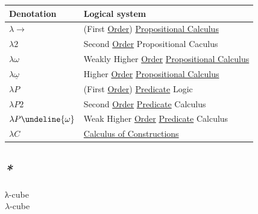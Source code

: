 \documentclass[a4paper,14pt,oneside]{book}
\begin{document}
\begin{table}[htbp]
\label{tab--lambda-calculus-names}
\centering
\begin{tabular}{ll}
Denotation & Logical system\\
\hline
\(\lambda\to\) & (First \hyperref[orgbd3dc49]{Order}) \hyperref[org263523b]{Propositional Calculus}\\
\(\lambda2\) & Second \hyperref[orgbd3dc49]{Order} Propositional Caculus\\
\(\lambda\omega\) & Weakly Higher \hyperref[orgbd3dc49]{Order} \hyperref[org263523b]{Propositional Calculus}\\
\(\lambda \underline{\omega}\) & Higher \hyperref[orgbd3dc49]{Order} \hyperref[org263523b]{Propositional Calculus}\\
\(\lambda P\) & (First \hyperref[orgbd3dc49]{Order}) \hyperref[org63300f1]{Predicate} Logic\\
\(\lambda P 2\) & Second \hyperref[orgbd3dc49]{Order} \hyperref[org63300f1]{Predicate} Calculus\\
\(\lambda P \undeline{\omega}\) & Weak Higher \hyperref[orgbd3dc49]{Order} \hyperref[org63300f1]{Predicate} Calculus\\
\(\lambda C\) & \hyperref[orgc62bfbb]{Calculus of Constructions}\\
\end{tabular}
\end{table}

\subsection{\emph{*}}
\label{sec:org54d3b33}

\label{org4e4708c}λ-cube\\
\label{org9a528c4}\(\lambda\)-cube\\
\end{document}
